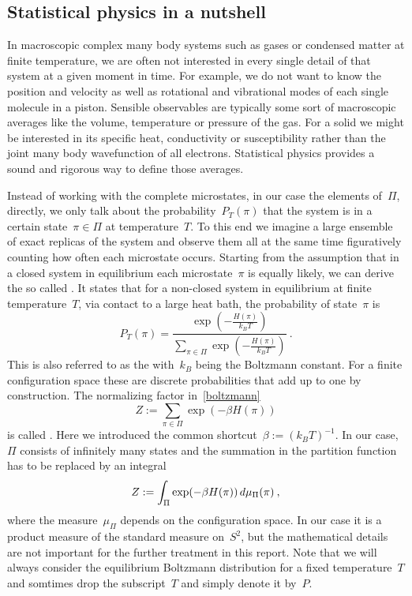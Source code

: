 \subsection{Statistical physics in a nutshell}

In macroscopic complex many body systems such as gases or condensed matter at
finite temperature, we are often not interested in every single detail of that
system at a given moment in time.  For example, we do not want to know the
position and velocity as well as rotational and vibrational modes of each single
molecule in a piston. Sensible observables are typically some sort of
macroscopic averages like the volume, temperature or pressure of the gas. For a
solid we might be interested in its specific heat, conductivity or
susceptibility rather than the joint many body wavefunction of all electrons.
Statistical physics provides a sound and rigorous way to define those averages.

Instead of working with the complete microstates, in our case the elements
of~$\Pi$, directly, we only talk about the probability~$P_{T}(\pi)$ that the
system is in a certain state~$\pi \in \Pi$ at temperature~$T$. To this end we
imagine a large ensemble of exact replicas of the system and observe them all at
the same time figuratively counting how often each microstate occurs. Starting
from the assumption that in a closed system in equilibrium each microstate~$\pi$
is equally likely, we can derive the so called . It
states that for a non-closed system in equilibrium at finite temperature~$T$,
\eg{} via contact to a large heat bath, the probability of state~$\pi$ is
%
\begin{equation}\label{boltzmann}
  P_{T}(\pi) = \frac{\exp \left(- \frac{H(\pi)}{k_B T}\right)}
  {\sum_{\pi \in \Pi} \exp \left(- \frac{H(\pi)}{k_B T}\right)}\:.
\end{equation}
%
This is also referred to as the 
with~$k_B$ being the Boltzmann constant. For a finite configuration space these
are discrete probabilities that add up to one by construction. The normalizing
factor in~\eqref{boltzmann}
%
\begin{equation}
  Z := \sum_{\pi \in \Pi} \exp(-\beta H(\pi))
\end{equation}
%
is called . Here we introduced the common
shortcut~$\beta := {(k_B T)}^{-1}$. In our case,~$\Pi$ consists of infinitely
many states and the summation in the partition function has to be replaced by an
integral
%
\begin{equation}
  Z := \int_{\Pi} \exp(-\beta H(\pi)) \,d\mu_{\Pi}(\pi)\:,
\end{equation}
%
where the measure~$\mu_{\Pi}$ depends on the configuration space. In our case it
is a product measure of the standard measure on~$S^2$, but the mathematical
details are not important for the further treatment in this report. Note that we
will always consider the equilibrium Boltzmann distribution for a fixed
temperature~$T$ and somtimes drop the subscript~$T$ and simply denote it by~$P$.

